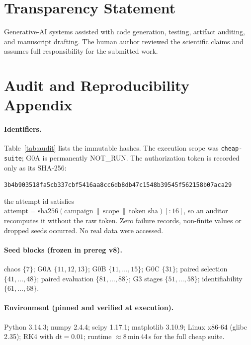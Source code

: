 \documentclass[11pt]{article}
\begin{document}
\section*{Transparency Statement}

Generative-AI systems assisted with code generation, testing, artifact
auditing, and manuscript drafting. The human author reviewed the scientific
claims and assumes full responsibility for the submitted work.

\appendix

\section{Audit and Reproducibility Appendix}
\label{app:audit}

\paragraph{Identifiers.} Table~\ref{tab:audit} lists the immutable hashes.
The execution scope was \texttt{cheap-suite}; G0A is permanently NOT\_RUN.
The authorization token is recorded only as its SHA-256:
\begin{center}
\footnotesize\texttt{3b4b903518fa5cb337cbf5416aa8cc6db8db47c1548b39545f562158b07aca29}
\end{center}
\noindent the attempt id satisfies
$\mathrm{attempt}=\mathrm{sha256}(\mathrm{campaign}\,\|\,\mathrm{scope}\,\|\,\mathrm{token\_sha})[:16]$,
so an auditor recomputes it without the raw token. Zero failure records,
non-finite values or dropped seeds occurred. No real data were accessed.



\paragraph{Seed blocks (frozen in prereg v8).}
chaos $\{7\}$; G0A $\{11,12,13\}$; G0B $\{11,\dots,15\}$; G0C $\{31\}$;
paired selection $\{41,\dots,48\}$; paired evaluation $\{81,\dots,88\}$;
G3 stages $\{51,\dots,58\}$; identifiability $\{61,\dots,68\}$.

\paragraph{Environment (pinned and verified at execution).}
Python 3.14.3; numpy 2.4.4; scipy 1.17.1; matplotlib 3.10.9; Linux x86-64
(glibc 2.35); RK4 with $\mathrm{d}t=0.01$; runtime $\approx 8$\,min\,44\,s for
the full cheap suite.
\end{document}
